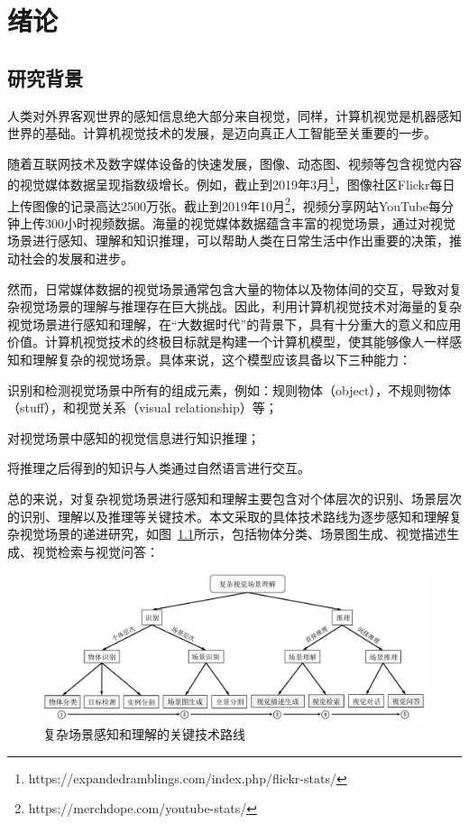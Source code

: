 \chapter{绪论}


\section{研究背景}
人类对外界客观世界的感知信息绝大部分来自视觉，同样，计算机视觉是机器感知世界的基础。计算机视觉技术的发展，是迈向真正人工智能至关重要的一步。

随着互联网技术及数字媒体设备的快速发展，图像、动态图、视频等包含视觉内容的视觉媒体数据呈现指数级增长。例如，截止到2019年3月\footnote{https://expandedramblings.com/index.php/flickr-stats/}，图像社区Flickr每日上传图像的记录高达2500万张。截止到2019年10月\footnote{https://merchdope.com/youtube-stats/}，视频分享网站YouTube每分钟上传300小时视频数据。海量的视觉媒体数据蕴含丰富的视觉场景，通过对视觉场景进行感知、理解和知识推理，可以帮助人类在日常生活中作出重要的决策，推动社会的发展和进步。

然而，日常媒体数据的视觉场景通常包含大量的物体以及物体间的交互，导致对复杂视觉场景的理解与推理存在巨大挑战。因此，利用计算机视觉技术对海量的复杂视觉场景进行感知和理解，在“大数据时代”的背景下，具有十分重大的意义和应用价值。计算机视觉技术的终极目标就是构建一个计算机模型，使其能够像人一样感知和理解复杂的视觉场景。具体来说，这个模型应该具备以下三种能力：
\begin{asparaenum}
\item 识别和检测视觉场景中所有的组成元素，例如：规则物体（object），不规则物体（stuff），和视觉关系（visual relationship）等；

\item 对视觉场景中感知的视觉信息进行知识推理；

\item 将推理之后得到的知识与人类通过自然语言进行交互。
\end{asparaenum}

总的来说，对复杂视觉场景进行感知和理解主要包含对个体层次的识别、场景层次的识别、理解以及推理等关键技术。本文采取的具体技术路线为逐步感知和理解复杂视觉场景的递进研究，如图~\ref{ch1:fig:scene_understanding}所示，包括物体分类、场景图生成、视觉描述生成、视觉检索与视觉问答：

\begin{figure}[htbp]
    \centering
        \includegraphics[width=0.95\linewidth]{chapter1/res/scene_understanding.pdf}
    \centering
    \caption{复杂场景感知和理解的关键技术路线}
    \label{ch1:fig:scene_understanding}
\end{figure}

